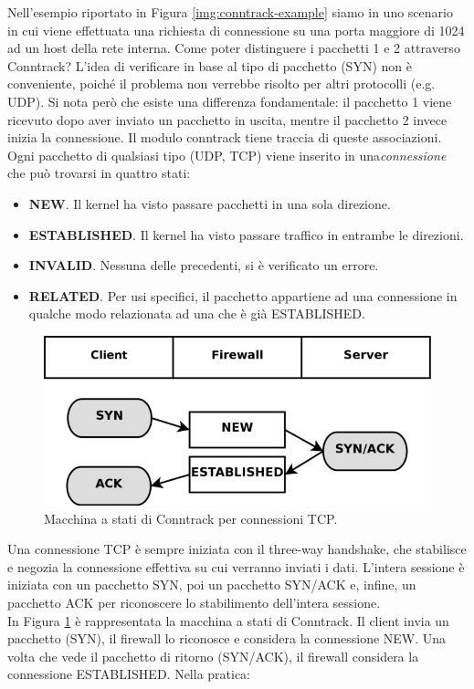 Nell'esempio riportato in Figura \ref{img:conntrack-example} siamo in uno scenario in cui viene effettuata una richiesta di connessione su una porta maggiore di 1024 ad un host della rete interna. Come poter distinguere i pacchetti 1 e 2 attraverso Conntrack? L'idea di verificare in base al tipo di pacchetto (SYN) non è conveniente, poiché il problema non verrebbe risolto per altri protocolli (e.g. UDP). Si nota però che esiste una differenza fondamentale: il pacchetto 1 viene ricevuto dopo aver inviato un pacchetto in uscita, mentre il pacchetto 2 invece inizia la connessione. Il modulo conntrack tiene traccia di queste associazioni. Ogni pacchetto di qualsiasi tipo (UDP, TCP) viene inserito in una\textit{connessione} che può trovarsi in quattro stati:
\begin{itemize}
	\item \textbf{NEW}. Il kernel ha visto passare pacchetti in una sola direzione.
	\item \textbf{ESTABLISHED}. Il kernel ha visto passare traffico in entrambe le direzioni.
	\item \textbf{INVALID}. Nessuna delle precedenti, si è verificato un errore.
	\item \textbf{RELATED}. Per usi specifici, il pacchetto appartiene ad una connessione in qualche modo relazionata ad una che è già ESTABLISHED.
\end{itemize}
\begin{figure}[htbp]
	\centering
	\includegraphics[scale = 0.35]{images/conntrack-state-machine}
	\caption{Macchina a stati di Conntrack per connessioni TCP.}
	\label{img:conntrack-state-machine}
\end{figure}
Una connessione TCP è sempre iniziata con il three-way handshake, che stabilisce e negozia la connessione effettiva su cui verranno inviati i dati. L'intera sessione è iniziata con un pacchetto SYN, poi un pacchetto SYN/ACK e, infine, un pacchetto ACK per riconoscere lo stabilimento dell'intera sessione.\\
In Figura \ref{img:conntrack-state-machine} è rappresentata la macchina a stati di Conntrack. Il client invia un pacchetto (SYN), il firewall lo riconosce e considera la connessione NEW. Una volta che vede il pacchetto di ritorno (SYN/ACK), il firewall considera la connessione ESTABLISHED. Nella pratica:

